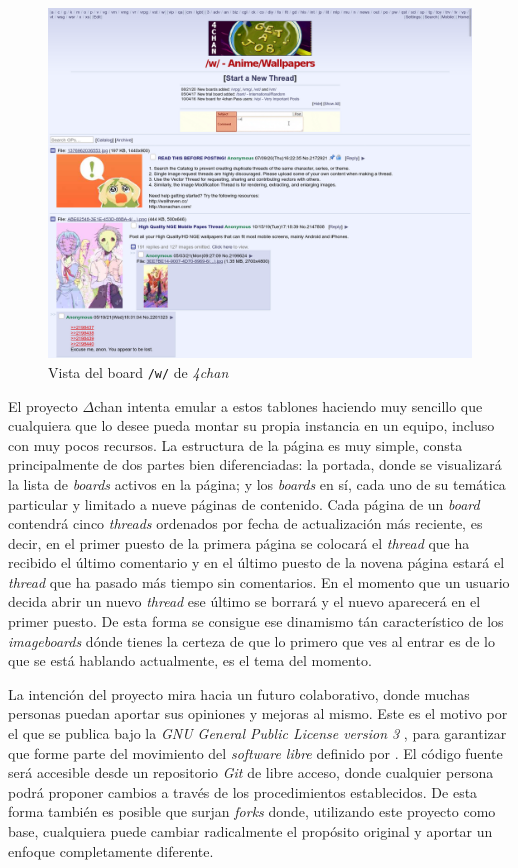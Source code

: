 \documentclass[12pt,a4paper,titlepage]{article}
\newcommand\projectname{$\Delta$chan}
\begin{document}
    \begin{figure}[ht]
        \centering
        \caption{Vista del board \texttt{/w/} de \textit{4chan}}\bigskip
        \label{4chan:board}
        \includegraphics[width=1.0\textwidth]{media/4chan-board.png}
    \end{figure}

    El proyecto {\projectname} intenta emular a estos tablones haciendo muy sencillo que cualquiera que lo desee pueda montar su propia instancia en un equipo, incluso con muy pocos recursos. La estructura de la página es muy simple, consta principalmente de dos partes bien diferenciadas: la portada, donde se visualizará la lista de \textit{boards} activos en la página; y los \textit{boards} en sí, cada uno de su temática particular y limitado a nueve páginas de contenido. Cada página de un \textit{board} contendrá cinco \textit{threads} ordenados por fecha de actualización más reciente, es decir, en el primer puesto de la primera página se colocará el \textit{thread} que ha recibido el último comentario y en el último puesto de la novena página estará el \textit{thread} que ha pasado más tiempo sin comentarios. En el momento que un usuario decida abrir un nuevo \textit{thread} ese último se borrará y el nuevo aparecerá en el primer puesto. De esta forma se consigue ese dinamismo tán característico de los \textit{imageboards} dónde tienes la certeza de que lo primero que ves al entrar es de lo que se está hablando actualmente, es el tema del momento.

    La intención del proyecto mira hacia un futuro colaborativo, donde muchas personas puedan aportar sus opiniones y mejoras al mismo. Este es el motivo por el que se publica bajo la \emph{GNU General Public License version 3} \cite{gnugplv3}, para garantizar que forme parte del movimiento del \emph{software libre} definido por \textcite{libresoftwaredefinition}. El código fuente será accesible desde un repositorio \emph{Git} de libre acceso, donde cualquier persona podrá proponer cambios a través de los procedimientos establecidos. De esta forma también es posible que surjan \textit{forks} \cite{wiki:fork} donde, utilizando este proyecto como base, cualquiera puede cambiar radicalmente el propósito original y aportar un enfoque completamente diferente.
\end{document}
